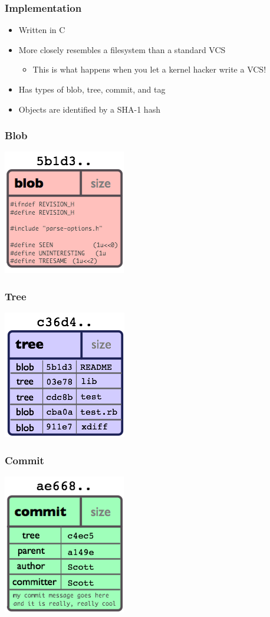 \documentclass{beamer}
\begin{document}
\begin{frame}
    \frametitle{Implementation}
    \begin{itemize}
	\item Written in C
	\item More closely resembles a filesystem than a standard VCS
	\begin{itemize}
	    \item This is what happens when you let a kernel hacker write a VCS!
	\end{itemize}
	\item Has types of blob, tree, commit, and tag
	\item Objects are identified by a SHA-1 hash
    \end{itemize}
\end{frame}

\begin{frame}
    \frametitle{Blob}
    \includegraphics{object-blob.png}
\end{frame}

\begin{frame}
    \frametitle{Tree}
    \includegraphics{object-tree.png}
\end{frame}

\begin{frame}
    \frametitle{Commit}
    \includegraphics{object-commit.png}
\end{frame}
\end{document}

